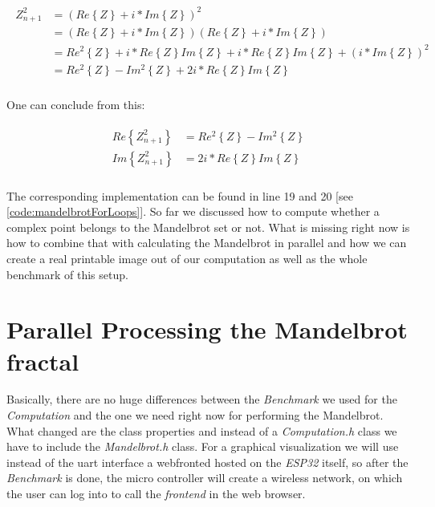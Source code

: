 \begin{align} \label{formula:simplicityTwo}
	\begin{aligned}
		Z_{n+1}^2 &= \left( Re\left\lbrace Z \right\rbrace + i * Im\left\lbrace Z \right\rbrace \right) ^2\\
		&= \left( Re\left\lbrace Z \right\rbrace + i * Im\left\lbrace Z \right\rbrace \right) \left( Re\left\lbrace Z \right\rbrace + i * Im\left\lbrace Z \right\rbrace \right)\\
		&= Re^2\left\lbrace Z \right\rbrace + i * Re\left\lbrace Z \right\rbrace Im\left\lbrace Z \right\rbrace + i * Re\left\lbrace Z \right\rbrace Im\left\lbrace Z \right\rbrace + \left(i * Im\left\lbrace Z \right\rbrace \right)^2\\
		&= Re^2\left\lbrace Z \right\rbrace - Im^2\left\lbrace Z \right\rbrace + 2i * Re\left\lbrace Z \right\rbrace Im\left\lbrace Z \right\rbrace
	\end{aligned}
\end{align}\\ 

\noindent One can conclude from this:

\begin{align} \label{formula:simplicityThree}
	\begin{aligned}
		Re\left\lbrace Z_{n+1}^2 \right\rbrace &= Re^2\left\lbrace Z \right\rbrace - Im^2\left\lbrace Z \right\rbrace\\
		Im\left\lbrace Z_{n+1}^2 \right\rbrace &= 2i * Re\left\lbrace Z \right\rbrace Im\left\lbrace Z \right\rbrace
	\end{aligned}
\end{align}\\ 

\noindent The corresponding implementation can be found in line 19 and 20 [see \ref{code:mandelbrotForLoops}]. So far we discussed how to compute whether a complex point belongs to the Mandelbrot set or not. What is missing right now is how to combine that with calculating the Mandelbrot in parallel and how we can create a real printable image out of our computation as well as the whole benchmark of this setup.

\newpage

\section{Parallel Processing the Mandelbrot fractal}

Basically, there are no huge differences between the \textit{Benchmark} we used for the \textit{Computation} and the one we need right now for performing the Mandelbrot. What changed are the class properties and instead of a \textit{Computation.h} class we have to include the \textit{Mandelbrot.h} class. For a graphical visualization we will use instead of the uart interface a webfronted hosted on the \textit{ESP32} itself, so after the \textit{Benchmark} is done, the micro controller will create a wireless network, on which the user can log into to call the \textit{frontend} in the web browser.

